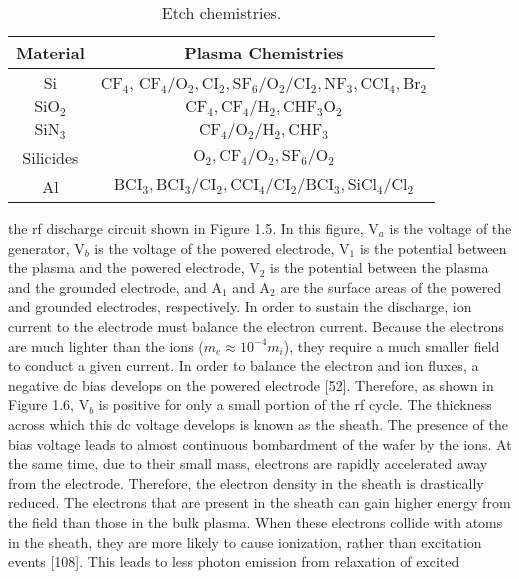 \begin{table}[H]
	\centering
	\begin{tabular}{|c|c|}
		\hline
		Material & Plasma Chemistries \\
		\hline
		Si & $\text{CF}_{4} $, $\text{CF}_{4}$/$\text{O}_{2} , \text{CI}_{2}, \text{SF}_{6}/\text{O}_{2}/\text{CI}_{2}, \text{NF}_{3}, \text{CCI}_{4}, \text{Br}_{2}$ \\
		\hline
		$\text{SiO}_{2}$ & $\text{CF}_{4}, \text{CF}_{4}/\text{H}_{2}, \text{CHF}_{3}\text{O}_{2}$ \\
		\hline
		$\text{SiN}_{3}$ & $\text{CF}_{4}/\text{O}_{2}/\text{H}_{2}, \text{CHF}_{3}$ \\
		\hline
		Silicides & $\text{O}_{2}, \text{CF}_{4}/\text{O}_{2}, \text{SF}_{6}/\text{O}_{2}$\\
		\hline
		Al & $\text{BCI}_{3}, \text{BCI}_{3}/\text{CI}_{2}, \text{CCI}_{4}/\text{CI}_{2}/\text{BCI}_{3}, \text{SiCl}_{4}/\text{Cl}_{2}$ \\
		\hline
	\end{tabular}
	\bf\caption{ Etch chemistries.}
	\label{table:1.1}
\end{table}

\noindent the rf discharge circuit shown in Figure 1.5. In this figure, $\text{V}_{a}$ is the voltage of the generator, $\text{V}_{b}$ is the voltage of the powered electrode, $\text{V}_{1}$ is the potential between the plasma and the powered electrode, $\text{V}_{2}$ is the potential between the plasma and the grounded electrode, and $\text{A}_{1}$ and $\text{A}_{2}$ are the surface areas of the powered and grounded electrodes, respectively. In order to sustain the discharge, ion current to the electrode must balance the electron current. Because the electrons are much lighter than the ions ($m_{e} \approx 10^{-4}m_{i}$), they require a much smaller field to conduct a given current. In order to balance the electron and ion fluxes, a negative dc bias develops on the powered electrode [52]. Therefore, as shown in Figure 1.6, $\text{V}_{b}$ is positive for only a small portion of the rf cycle. The thickness across which this dc voltage develops is known as the sheath. The presence of the bias voltage leads to almost continuous bombardment of the wafer by the ions. At the same time, due to their small mass, electrons are rapidly accelerated away from the electrode. Therefore, the electron density in the sheath is drastically reduced. The electrons that are present in the sheath can gain higher energy from the field than those in the bulk plasma. When these electrons collide with atoms in the sheath, they are more likely to cause ionization, rather than excitation events [108]. This leads to less photon emission from relaxation of excited

